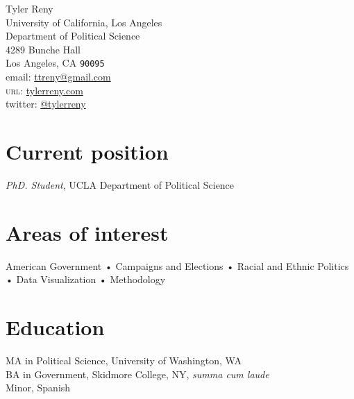 \documentclass[11pt, a4paper]{article}
\newcommand{\years}[1]{\marginnote{\scriptsize #1}}
\begin{document}
{\LARGE Tyler Reny}\\[1cm]
 University of California, Los Angeles\\
 Department of Political Science\\
 4289 Bunche Hall\\
 Los Angeles, CA \texttt{90095}\\
email: \href{mailto:ttreny@gmail.com}{ttreny@gmail.com}\\
\textsc{url}: \href{http://www.tylerreny.com}{tylerreny.com}\\ 
twitter: \href{http://www.twitter.com/tylerreny}{@tylerreny}\\ 

\section*{Current position}
\emph{PhD. Student}, UCLA Department of Political Science

\section*{Areas of interest}
 American Government • Campaigns and Elections • Racial and Ethnic Politics • Data Visualization • Methodology

\section*{Education}
\years{2015}\textsc{MA} in Political Science, University of Washington, WA\\
\years{2011}\textsc{BA} in Government, Skidmore College, NY, \textit{summa cum laude}\\
Minor, Spanish

\end{document}
